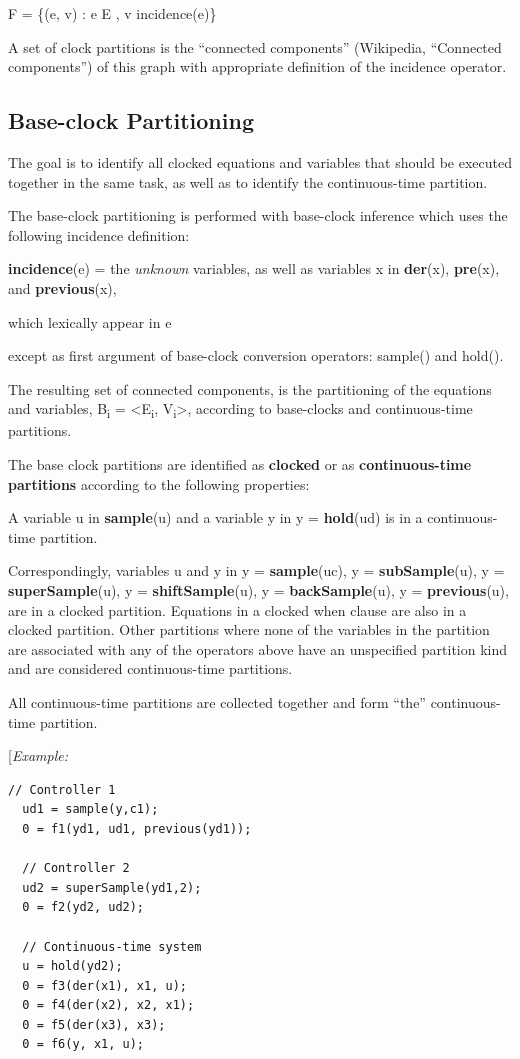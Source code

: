 \documentclass[10pt,a4paper]{report}
\def\doublelabel#1{\label{#1}}
\begin{document}
F = \{(e, v) : e E , v incidence(e)\}

A set of clock partitions is the ``connected components'' (Wikipedia,
``Connected components'') of this graph with appropriate definition of
the incidence operator.

\subsection{Base-clock Partitioning}\doublelabel{base-clock-partitioning}

The goal is to identify all clocked equations and variables that should
be executed together in the same task, as well as to identify the
continuous-time partition.

The base-clock partitioning is performed with base-clock inference which
uses the following incidence definition:

\textbf{incidence}(e) = the \emph{unknown} variables, as well as
variables x in \textbf{der}(x), \textbf{pre}(x), and
\textbf{previous}(x),

which lexically appear in e

except as first argument of base-clock conversion operators: sample() and hold().

The resulting set of connected components, is the partitioning of the
equations and variables, B\textsubscript{i} =
\textless{}E\textsubscript{i}, V\textsubscript{i}\textgreater{},
according to base-clocks and continuous-time partitions.

The base clock partitions are identified as \textbf{clocked} or as
\textbf{continuous-time partitions} according to the following
properties:

A variable u in \textbf{sample}(u) and a variable y in y =
\textbf{hold}(ud) is in a continuous-time partition.

Correspondingly, variables u and y in y = \textbf{sample}(uc), y =
\textbf{subSample}(u), y = \textbf{superSample}(u), y =
\textbf{shiftSample}(u), y = \textbf{backSample}(u), y =
\textbf{previous}(u), are in a clocked partition. Equations in a clocked
when clause are also in a clocked partition.
Other partitions where none of the variables in the partition are
associated with any of the operators above have an unspecified partition
kind and are considered continuous-time partitions.

All continuous-time partitions are collected together and form ``the''
continuous-time partition.

{[}\emph{Example:}
\begin{lstlisting}[language=modelica]
  // Controller 1
  ud1 = sample(y,c1);
  0 = f1(yd1, ud1, previous(yd1));

  // Controller 2
  ud2 = superSample(yd1,2);
  0 = f2(yd2, ud2);

  // Continuous-time system
  u = hold(yd2);
  0 = f3(der(x1), x1, u);
  0 = f4(der(x2), x2, x1);
  0 = f5(der(x3), x3);
  0 = f6(y, x1, u);
\end{lstlisting}
\end{document}
